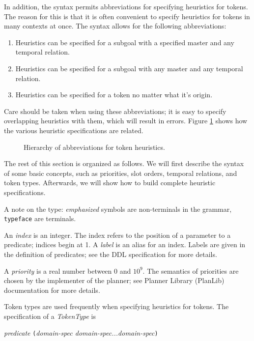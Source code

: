 In addition, the syntax permits abbreviations for specifying
heuristics for tokens.  The reason for this is that it is often
convenient to specify heuristics for tokens in many contexts
at once.  The syntax allows for the following abbreviations:
\begin{enumerate}
    \item Heuristics can be specified for a subgoal with a specified
    master and any temporal relation.
    \item Heuristics can be specified for a subgoal with any master
    and any temporal relation.
    \item Heuristics can be specified for a token no matter what it's
    origin.
\end{enumerate}

Care should be taken when using these abbreviations; it is easy to
specify overlapping heuristics with them, which will result in errors.  
Figure
\ref{abbr} shows how the various heuristic specifications are related.
\begin{figure}[btph]
\centerline{
}
\caption{\label{abbr} Hierarchy of abbreviations for
token heuristics.}
\end{figure}

The rest of this section is organized as follows.  We will first describe
the syntax of some basic concepts, such as priorities, slot orders, temporal
relations, and token types.  Afterwards, we will show how to build complete
heuristic specifications.

A note on the type: {\em emphasized} symbols are non-terminals in the grammar,
{\tt typeface} are terminals.  

An {\em index} is an integer.  The index refers to the position of a parameter
to a predicate; indices begin at 1.  
A {\em label} is an alias for an index.  Labels are given
in the definition of predicates; see the DDL specification for more details.

A {\em priority} is a real number between 0 and $10^9$.  The semantics of
priorities are chosen by the implementer of the planner; see Planner Library
(PlanLib) documentation for more details.

Token types are used frequently when specifying heuristics for tokens.
The specification of a {\em TokenType} is

{\em predicate} {\tt(}{\em domain-spec domain-spec...domain-spec}{\tt )}

